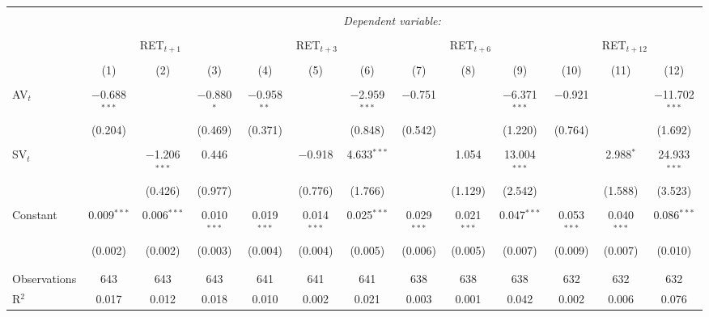 
\begin{table}[!htbp] \centering 
  \caption{} 
  \label{} 
\begin{tabular}{@{\extracolsep{5pt}}lcccccccccccc} 
\\[-1.8ex]\hline 
\hline \\[-1.8ex] 
 & \multicolumn{12}{c}{\textit{Dependent variable:}} \\ 
\cline{2-13} 
\\[-1.8ex] & \multicolumn{3}{c}{RET$_{t+1}$} & \multicolumn{3}{c}{RET$_{t+3}$} & \multicolumn{3}{c}{RET$_{t+6}$} & \multicolumn{3}{c}{RET$_{t+12}$} \\ 
\\[-1.8ex] & (1) & (2) & (3) & (4) & (5) & (6) & (7) & (8) & (9) & (10) & (11) & (12)\\ 
\hline \\[-1.8ex] 
 AV$_{t}$ & $-$0.688$^{***}$ &  & $-$0.880$^{*}$ & $-$0.958$^{**}$ &  & $-$2.959$^{***}$ & $-$0.751 &  & $-$6.371$^{***}$ & $-$0.921 &  & $-$11.702$^{***}$ \\ 
  & (0.204) &  & (0.469) & (0.371) &  & (0.848) & (0.542) &  & (1.220) & (0.764) &  & (1.692) \\ 
  & & & & & & & & & & & & \\ 
 SV$_{t}$ &  & $-$1.206$^{***}$ & 0.446 &  & $-$0.918 & 4.633$^{***}$ &  & 1.054 & 13.004$^{***}$ &  & 2.988$^{*}$ & 24.933$^{***}$ \\ 
  &  & (0.426) & (0.977) &  & (0.776) & (1.766) &  & (1.129) & (2.542) &  & (1.588) & (3.523) \\ 
  & & & & & & & & & & & & \\ 
 Constant & 0.009$^{***}$ & 0.006$^{***}$ & 0.010$^{***}$ & 0.019$^{***}$ & 0.014$^{***}$ & 0.025$^{***}$ & 0.029$^{***}$ & 0.021$^{***}$ & 0.047$^{***}$ & 0.053$^{***}$ & 0.040$^{***}$ & 0.086$^{***}$ \\ 
  & (0.002) & (0.002) & (0.003) & (0.004) & (0.004) & (0.005) & (0.006) & (0.005) & (0.007) & (0.009) & (0.007) & (0.010) \\ 
  & & & & & & & & & & & & \\ 
\hline \\[-1.8ex] 
Observations & 643 & 643 & 643 & 641 & 641 & 641 & 638 & 638 & 638 & 632 & 632 & 632 \\ 
R$^{2}$ & 0.017 & 0.012 & 0.018 & 0.010 & 0.002 & 0.021 & 0.003 & 0.001 & 0.042 & 0.002 & 0.006 & 0.076 \\ 

\end{tabular}
\end{table}
